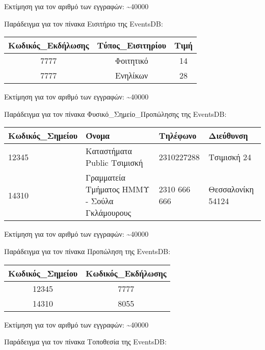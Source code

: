 Εκτίμηση για τον αριθμό των εγγραφών: \textasciitilde 40000

Παράδειγμα για τον πίνακα Εισιτήριο της EventsDB:

\begin{table}[H]
  \centering
  \footnotesize
  \begin{tabular}{|c|c|c|}
  \hline
  Κωδικός\_Εκδήλωσης & Τύπος\_Εισιτηρίου & Τιμή \\ \hline
  7777 & Φοιτητικό & 14 \\ \hline
  7777 & Ενηλίκων & 28 \\ \hline
\end{tabular}
\end{table}
  
Εκτίμηση για τον αριθμό των εγγραφών: \textasciitilde 40000

Παράδειγμα για τον πίνακα Φυσικό\_Σημείο\_Προπώλησης της EventsDB:

\begin{table}[H]
  \centering
  \footnotesize
  \begin{tabular}{|p{3cm}|p{4cm}|p{3cm}|p{3cm}|}
  \hline
  Κωδικός\_Σημείου & Όνομα & Τηλέφωνο & Διεύθυνση \\ \hline
  12345 & Καταστήματα Public Τσιμισκή & 2310227288 & Τσιμισκή 24 \\ \hline
  14310 & Γραμματεία Τμήματος ΗΜΜΥ - Σούλα Γκλάμουρους & 2310 666 666 & Θεσσαλονίκη 54124 \\ \hline
\end{tabular}
\end{table}
  
Εκτίμηση για τον αριθμό των εγγραφών: \textasciitilde 40000

Παράδειγμα για τον πίνακα Προπώληση της EventsDB:

\begin{table}[H]
  \centering
  \footnotesize
  \begin{tabular}{|c|c|}
  \hline
  Κωδικός\_Σημείου & Κωδικός\_Εκδήλωσης \\ \hline
  12345 & 7777 \\ \hline
  14310 & 8055 \\ \hline
\end{tabular}
\end{table}
  
Εκτίμηση για τον αριθμό των εγγραφών: \textasciitilde 40000

Παράδειγμα για τον πίνακα Τοποθεσία της EventsDB:

